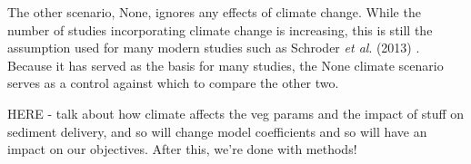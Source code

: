The other scenario, None, ignores any effects of climate change. While the number of studies incorporating climate change is increasing, this is still the assumption used for many modern studies such as Schroder \textit{et al}. (2013) \cite{schroder2016multi}. Because it has served as the basis for many studies, the None climate scenario serves as a control against which to compare the other two.

HERE - talk about how climate affects the veg params and the impact of stuff on sediment delivery, and so will change model coefficients and so will have an impact on our objectives. After this, we're done with methods!


%
%

